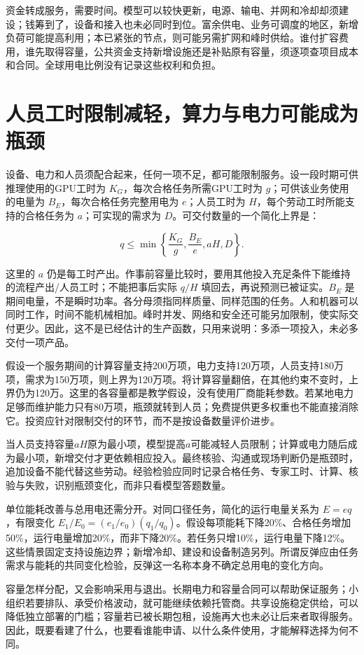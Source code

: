 \documentclass[UTF8,fontset=windows,12pt,a4paper,oneside,openany]{ctexbook}
\begin{document}
资金转成服务，需要时间。模型可以较快更新，电源、输电、并网和冷却却须建设；钱筹到了，设备和接入也未必同时到位。富余供电、业务可调度的地区，新增负荷可能提高利用；本已紧张的节点，则可能另需扩网和峰时供给。谁付扩容费用，谁先取得容量，公共资金支持新增设施还是补贴原有容量，须逐项查项目成本和合同。全球用电比例没有记录这些权利和负担。

\section{人员工时限制减轻，算力与电力可能成为瓶颈}

设备、电力和人员须配合起来，任何一项不足，都可能限制服务。设一段时期可供推理使用的GPU工时为 $K_G$，每次合格任务所需GPU工时为 $g$；可供该业务使用的电量为 $B_E$，每次合格任务完整用电为 $e$；人员工时为 $H$，每个劳动工时所能支持的合格任务为 $a$；可实现的需求为 $D$。可交付数量的一个简化上界是：

\[
q\le\min\left\{\frac{K_G}{g},\frac{B_E}{e},aH,D\right\}.
\]

这里的 $a$ 仍是每工时产出。作事前容量比较时，要用其他投入充足条件下能维持的流程产出/人员工时；不能把事后实际 $q/H$ 填回去，再说预测已被证实。$B_E$ 是期间电量，不是瞬时功率。各分母须指同样质量、同样范围的任务。人和机器可以同时工作，时间不能机械相加。峰时并发、网络和安全还可能另加限制，使实际交付更少。因此，这不是已经估计的生产函数，只用来说明：多添一项投入，未必多交付一项产品。

假设一个服务期间的计算容量支持200万项，电力支持120万项，人员支持180万项，需求为150万项，则上界为120万项。将计算容量翻倍，在其他约束不变时，上界仍为120万。这里的各容量都是教学假设，没有使用厂商能耗参数。若某地电力足够而维护能力只有80万项，瓶颈就转到人员；免费提供更多权重也不能直接消除它。投资应针对限制交付的环节，而不是按设备数量评价进步。

当人员支持容量$aH$原为最小项，模型提高$a$可能减轻人员限制；计算或电力随后成为最小项，新增交付才更依赖相应投入。最终核验、沟通或现场判断仍是瓶颈时，追加设备不能代替这些劳动。经验检验应同时记录合格任务、专家工时、计算、核验与失败，识别瓶颈变化，而非只看模型答题数量。

单位能耗改善与总用电还需分开。对同口径任务，简化的运行电量关系为 $E=e q$，有限变化 $E_1/E_0=(e_1/e_0)(q_1/q_0)$。假设每项能耗下降20\%、合格任务增加50\%，运行电量增加20\%，而非下降20\%。若任务只增10\%，运行电量下降12\%。这些情景固定支持设施边界；新增冷却、建设和设备制造另列。所谓反弹应由任务需求与能耗的共同变化检验，反弹这一名称本身不确定总用电的变化方向。

容量怎样分配，又会影响采用与退出。长期电力和容量合同可以帮助保证服务；小组织若要排队、承受价格波动，就可能继续依赖托管商。共享设施稳定供给，可以降低独立部署的门槛；容量若已被长期包租，设施再大也未必让后来者取得服务。因此，既要看建了什么，也要看谁能申请、以什么条件使用，才能解释选择为何不同。
\end{document}
